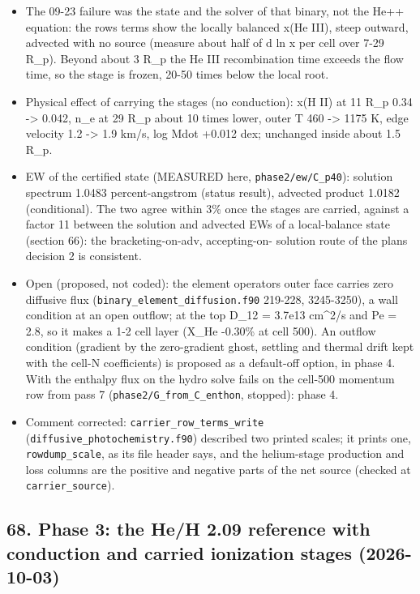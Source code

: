 \documentclass[english,a4paper]{my_memo}
\providecommand{\tightlist}{\setlength{\itemsep}{0pt}\setlength{\parskip}{0pt}}
\begin{document}
\begin{itemize}
\tightlist
\item
  The 09-23 failure was the state and the solver of that binary, not the
  He++ equation: the row\textquotesingle s terms show the locally balanced x(He III),
  steep outward, advected with no source (measure about half of d ln x per
  cell over 7-29 R\_p). Beyond about 3 R\_p the He III recombination time
  exceeds the flow time, so the stage is frozen, 20-50 times below the
  local root.
\item
  Physical effect of carrying the stages (no conduction): x(H II) at
  11 R\_p 0.34 -\textgreater{} 0.042, n\_e at 29 R\_p about 10 times lower, outer T 460 -\textgreater{}
  1175 K, edge velocity 1.2 -\textgreater{} 1.9 km/s, log Mdot +0.012 dex; unchanged
  inside about 1.5 R\_p.
\item
  EW of the certified state (MEASURED here, \texttt{phase2/ew/C\_p40}): solution
  spectrum 1.0483 percent-angstrom (status result), advected product
  1.0182 (conditional). The two agree within 3\% once the stages are
  carried, against a factor 11 between the solution and advected EWs of a
  local-balance state (section 66): the bracketing-on-adv, accepting-on-
  solution route of the plan\textquotesingle s decision 2 is consistent.
\item
  Open (proposed, not coded): the element operator\textquotesingle s outer face carries
  zero diffusive flux (\texttt{binary\_element\_diffusion.f90} 219-228, 3245-3250),
  a wall condition at an open outflow; at the top D\_12 = 3.7e13 cm\^{}2/s and
  Pe = 2.8, so it makes a 1-2 cell layer (X\_He -0.30\% at cell 500). An
  outflow condition (gradient by the zero-gradient ghost, settling and
  thermal drift kept with the cell-N coefficients) is proposed as a
  default-off option, in phase 4. With the enthalpy flux on the hydro solve
  fails on the cell-500 momentum row from pass 7 (\texttt{phase2/G\_from\_C\_enthon},
  stopped): phase 4.
\item
  Comment corrected: \texttt{carrier\_row\_terms\_write} (\texttt{diffusive\_photochemistry.f90})
  described two printed scales; it prints one, \texttt{rowdump\_scale}, as its file
  header says, and the helium-stage production and loss columns are the
  positive and negative parts of the net source (checked at
  \texttt{carrier\_source}).
\end{itemize}

\subsection{68. Phase 3: the He/H 2.09 reference with conduction and carried ionization stages (2026-10-03)}\label{68-phase-3-the-heh-209-reference-with-conduction-and-carried-ionization-stages-2026-10-03}
\end{document}
